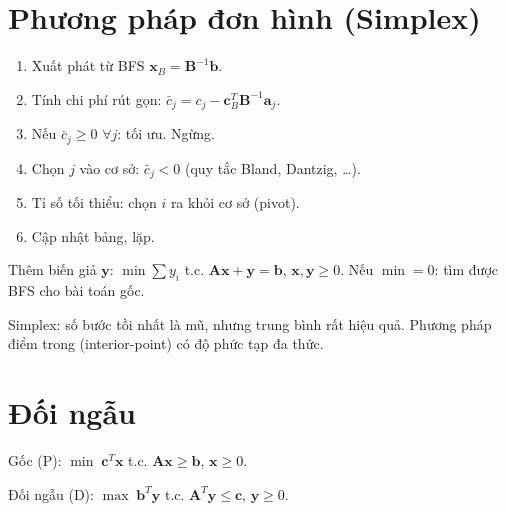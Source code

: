 \documentclass[12pt,a4paper]{article}
\begin{document}
\section{Phương pháp đơn hình (Simplex)}

\begin{phuongphap}[title={Thuật toán Simplex}]
  \begin{enumerate}
    \item Xuất phát từ BFS $\mathbf{x}_B = \mathbf{B}^{-1}\mathbf{b}$.
    \item Tính chi phí rút gọn: $\bar{c}_j = c_j - \mathbf{c}_B^T \mathbf{B}^{-1}\mathbf{a}_j$.
    \item Nếu $\bar{c}_j \ge 0$ $\forall j$: tối ưu. Ngừng.
    \item Chọn $j$ vào cơ sở: $\bar{c}_j < 0$ (quy tắc Bland, Dantzig, \ldots).
    \item Tỉ số tối thiểu: chọn $i$ ra khỏi cơ sở (pivot).
    \item Cập nhật bảng, lặp.
  \end{enumerate}
\end{phuongphap}

\begin{phuongphap}[title={Pha 1 --- Tìm BFS ban đầu}]
  Thêm biến giả $\mathbf{y}$: $\min \sum y_i$ t.c. $\mathbf{A}\mathbf{x} + \mathbf{y} = \mathbf{b}$, $\mathbf{x}, \mathbf{y} \ge 0$. Nếu $\min = 0$: tìm được BFS cho bài toán gốc.
\end{phuongphap}

\begin{luuy}
  Simplex: số bước tồi nhất là mũ, nhưng trung bình rất hiệu quả. Phương pháp điểm trong (interior-point) có độ phức tạp đa thức.
\end{luuy}

\section{Đối ngẫu}

\begin{dinhnghia}[title={Bài toán đối ngẫu}]
  Gốc (P): $\min\;\mathbf{c}^T\mathbf{x}$ t.c. $\mathbf{A}\mathbf{x} \ge \mathbf{b}$, $\mathbf{x} \ge 0$.

  Đối ngẫu (D): $\max\;\mathbf{b}^T\mathbf{y}$ t.c. $\mathbf{A}^T\mathbf{y} \le \mathbf{c}$, $\mathbf{y} \ge 0$.
\end{dinhnghia}
\end{document}
